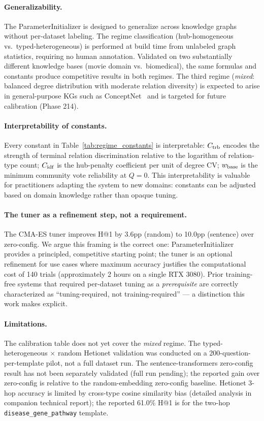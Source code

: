 \documentclass[11pt,a4paper]{article}
\begin{document}
\paragraph{Generalizability.}
The ParameterInitializer is designed to generalize across knowledge graphs
without per-dataset labeling.
The regime classification (hub-homogeneous vs.\ typed-heterogeneous) is
performed at build time from unlabeled graph statistics, requiring no
human annotation.
Validated on two substantially different knowledge bases (movie domain
vs.\ biomedical), the same formulas and constants produce competitive
results in both regimes.
The third regime (\textit{mixed}: balanced degree distribution with
moderate relation diversity) is expected to arise in general-purpose
KGs such as ConceptNet~\cite{speer2017conceptnet} and is targeted for
future calibration (Phase 214).

\paragraph{Interpretability of constants.}
Every constant in Table~\ref{tab:regime_constants} is interpretable:
$C_{\rm trb}$ encodes the strength of terminal relation discrimination
relative to the logarithm of relation-type count;
$C_{\rm idf}$ is the hub-penalty coefficient per unit of degree CV;
$w_{\rm base}$ is the minimum community vote reliability at $Q = 0$.
This interpretability is valuable for practitioners adapting the system
to new domains: constants can be adjusted based on domain knowledge
rather than opaque tuning.

\paragraph{The tuner as a refinement step, not a requirement.}
The CMA-ES tuner improves H@1 by 3.6pp (random) to 10.0pp (sentence) over
zero-config.
We argue this framing is the correct one: ParameterInitializer provides a
principled, competitive starting point; the tuner is an optional refinement
for use cases where maximum accuracy justifies the computational cost
of 140 trials (approximately 2 hours on a single RTX 3080).
Prior training-free systems that required per-dataset tuning as a
\emph{prerequisite} are correctly characterized as ``tuning-required,
not training-required'' --- a distinction this work makes explicit.

\paragraph{Limitations.}
The calibration table does not yet cover the \textit{mixed} regime.
The typed-heterogeneous $\times$ random Hetionet validation was conducted
on a 200-question-per-template pilot, not a full dataset run.
The sentence-transformers zero-config result has not been separately
validated (full run pending); the reported gain over zero-config is
relative to the random-embedding zero-config baseline.
Hetionet 3-hop accuracy is limited by cross-type cosine similarity bias
(detailed analysis in companion technical report); the reported 61.0\%
H@1 is for the two-hop \texttt{disease\_gene\_pathway} template.
\end{document}
